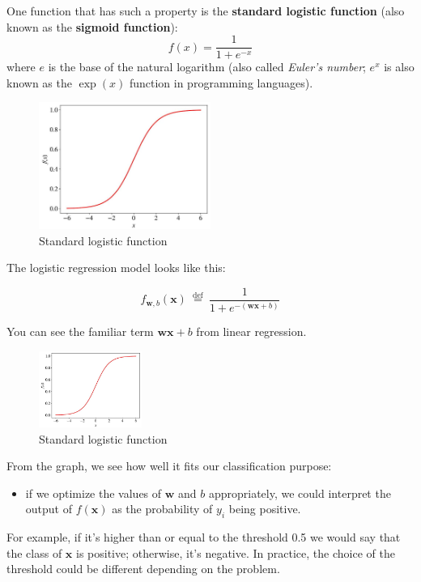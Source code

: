 \documentclass[9pt,dvipsnames]{beamer}
\begin{document}
\begin{frame}
One function that has such a property is the \textbf{standard logistic function} (also  known as the \textbf{sigmoid function}):
$$
f(x)=\frac{1}{1+e^{-x}}
$$
where $e$ is the base of the natural logarithm (also called \textit{Euler's number}; $e^{x}$ is also known as the $\exp (x)$ function in programming languages).
\begin{figure}
	\centering
	\includegraphics[width=0.5\textwidth]{imgs/algorithm_3.jpg}
	\caption{Standard logistic function}
\end{figure}
\end{frame}

\begin{frame}
	The logistic regression model looks like this:
	
	$$
	f_{\mathbf{w}, b}(\mathbf{x}) \stackrel{\text { def }}{=} \frac{1}{1+e^{-(\mathbf{w} \mathbf{x}+b)}}
	$$
	
	You can see the familiar term $\mathbf{w} \mathbf{x}+b$ from linear regression.
	\begin{figure}
		\centering
		\includegraphics[width=0.3\textwidth]{imgs/algorithm_3.jpg}
		\caption{Standard logistic function}
	\end{figure}
	From the graph, we see how well it fits our classification purpose: 
	\begin{itemize}
		\item if we optimize the values of $\mathbf{w}$ and $b$ appropriately, we could interpret the output of $f(\mathbf{x})$ as the probability of $y_{i}$ being positive. 
	\end{itemize}
	For example, if it's higher than or equal to the threshold 0.5 we would say that the class of $\mathbf{x}$ is positive; otherwise, it's negative. In practice, the choice of the threshold could be different depending on the problem.
\end{frame}
\end{document}
